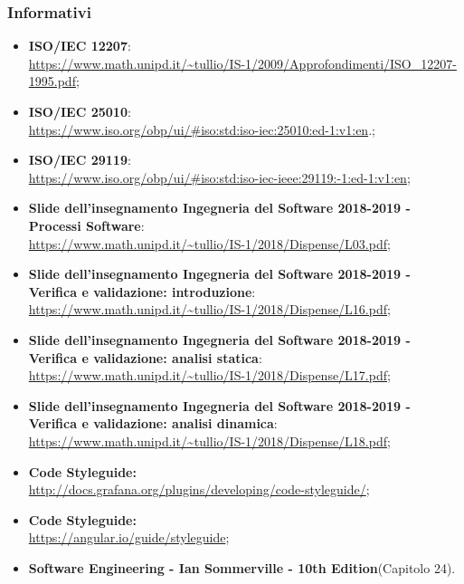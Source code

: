 \subsubsection{Informativi}
\begin{itemize}
	\item \textbf{ISO/IEC 12207}:\\ \url{https://www.math.unipd.it/~tullio/IS-1/2009/Approfondimenti/ISO_12207-1995.pdf};
	\item \textbf{ISO/IEC 25010}:\\ \url{https://www.iso.org/obp/ui/#iso:std:iso-iec:25010:ed-1:v1:en}.;
	\item \textbf{ISO/IEC 29119}:\\ \url{https://www.iso.org/obp/ui/#iso:std:iso-iec-ieee:29119:-1:ed-1:v1:en};
	\item \textbf{Slide dell'insegnamento Ingegneria del Software 2018-2019 - Processi Software}: \\
	\url{https://www.math.unipd.it/~tullio/IS-1/2018/Dispense/L03.pdf};
	\item \textbf{Slide dell'insegnamento Ingegneria del Software 2018-2019 - Verifica e validazione: introduzione}: \\
	\url{https://www.math.unipd.it/~tullio/IS-1/2018/Dispense/L16.pdf};
	\item \textbf{Slide dell'insegnamento Ingegneria del Software 2018-2019 - Verifica e validazione: analisi statica}: \\
	\url{https://www.math.unipd.it/~tullio/IS-1/2018/Dispense/L17.pdf};
	\item \textbf{Slide dell'insegnamento Ingegneria del Software 2018-2019 - Verifica e validazione: analisi dinamica}: \\
	\url{https://www.math.unipd.it/~tullio/IS-1/2018/Dispense/L18.pdf};
	\item \textbf{ Code Styleguide:} \\
	\url{http://docs.grafana.org/plugins/developing/code-styleguide/};
	\item \textbf{ Code Styleguide:} \\
	\url{https://angular.io/guide/styleguide};	
	\item \textbf{Software Engineering - Ian Sommerville - 10th Edition}(Capitolo 24).
\end{itemize}
\pagebreak
